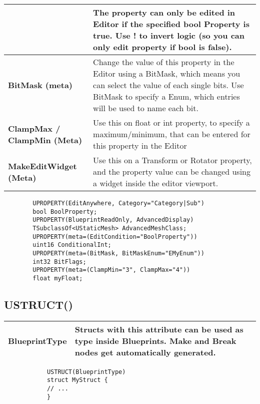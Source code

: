 \documentclass[10pt,a4paper]{article}
\begin{document}
\begin{multicols*}{2}
\begin{tabularx}{\columnwidth}{|p{3.5cm}|X|}
		&  The property can only be edited in Editor if the specified bool Property is true. Use ! to invert logic (so you can only edit property if bool is false). \\
		\hline \textbf{BitMask (meta)}
		& Change the value of this property in the Editor using a BitMask, which means you can select the value of each single bits. Use BitMask to specify a Enum, which entries will be used to name each bit. \\
		\hline \textbf{ClampMax / ClampMin (Meta)}
		& Use this on float or int property, to specify a maximum/minimum, that can be entered for this property in the Editor \\
		\hline \textbf {MakeEditWidget (Meta)}
		& Use this on a Transform or Rotator property, and the property value can be changed using a widget inside the editor viewport. \\
		\hline
	\end{tabularx}

	\begin{minipage}{\columnwidth}
	\begin{verbatim}
		UPROPERTY(EditAnywhere, Category="Category|Sub")
		bool BoolProperty;
		UPROPERTY(BlueprintReadOnly, AdvancedDisplay)
		TSubclassOf<UStaticMesh> AdvancedMeshClass;
		UPROPERTY(meta=(EditCondition="BoolProperty"))
		uint16 ConditionalInt;
		UPROPERTY(meta=(BitMask, BitMaskEnum="EMyEnum"))
		int32 BitFlags;
		UPROPERTY(meta=(ClampMin="3", ClampMax="4"))
		float myFloat;
	\end{verbatim}
\end{minipage}

	
	\subsection{USTRUCT()}
	
	\begin{tabularx}{\columnwidth}{|p{3.5cm}|X|}
		\hline \textbf{BlueprintType}
		& Structs with this attribute can be used as type inside Blueprints. Make and Break nodes get automatically generated.\\
		\hline
	\end{tabularx}
	
	\begin{minipage}{\columnwidth}
		\begin{verbatim}
			USTRUCT(BlueprintType)
			struct MyStruct {
			// ...
			}	
		\end{verbatim}
	\end{minipage}
	
\end{multicols*}
	
\end{document}
